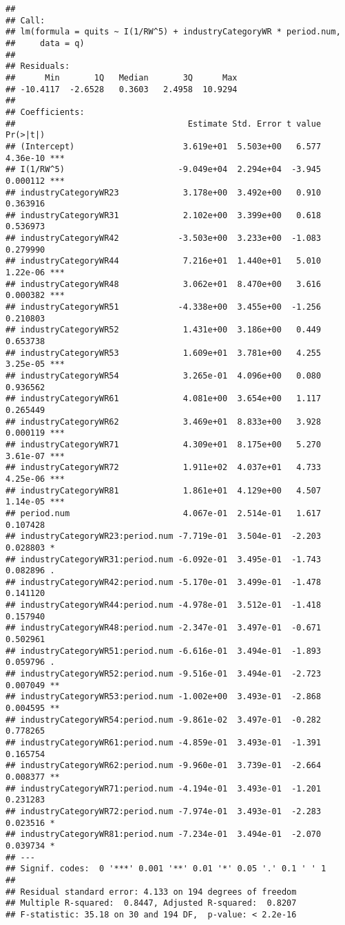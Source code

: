 \documentclass[
]{article}
\begin{document}
\begin{verbatim}
## 
## Call:
## lm(formula = quits ~ I(1/RW^5) + industryCategoryWR * period.num, 
##     data = q)
## 
## Residuals:
##      Min       1Q   Median       3Q      Max 
## -10.4117  -2.6528   0.3603   2.4958  10.9294 
## 
## Coefficients:
##                                   Estimate Std. Error t value Pr(>|t|)    
## (Intercept)                      3.619e+01  5.503e+00   6.577 4.36e-10 ***
## I(1/RW^5)                       -9.049e+04  2.294e+04  -3.945 0.000112 ***
## industryCategoryWR23             3.178e+00  3.492e+00   0.910 0.363916    
## industryCategoryWR31             2.102e+00  3.399e+00   0.618 0.536973    
## industryCategoryWR42            -3.503e+00  3.233e+00  -1.083 0.279990    
## industryCategoryWR44             7.216e+01  1.440e+01   5.010 1.22e-06 ***
## industryCategoryWR48             3.062e+01  8.470e+00   3.616 0.000382 ***
## industryCategoryWR51            -4.338e+00  3.455e+00  -1.256 0.210803    
## industryCategoryWR52             1.431e+00  3.186e+00   0.449 0.653738    
## industryCategoryWR53             1.609e+01  3.781e+00   4.255 3.25e-05 ***
## industryCategoryWR54             3.265e-01  4.096e+00   0.080 0.936562    
## industryCategoryWR61             4.081e+00  3.654e+00   1.117 0.265449    
## industryCategoryWR62             3.469e+01  8.833e+00   3.928 0.000119 ***
## industryCategoryWR71             4.309e+01  8.175e+00   5.270 3.61e-07 ***
## industryCategoryWR72             1.911e+02  4.037e+01   4.733 4.25e-06 ***
## industryCategoryWR81             1.861e+01  4.129e+00   4.507 1.14e-05 ***
## period.num                       4.067e-01  2.514e-01   1.617 0.107428    
## industryCategoryWR23:period.num -7.719e-01  3.504e-01  -2.203 0.028803 *  
## industryCategoryWR31:period.num -6.092e-01  3.495e-01  -1.743 0.082896 .  
## industryCategoryWR42:period.num -5.170e-01  3.499e-01  -1.478 0.141120    
## industryCategoryWR44:period.num -4.978e-01  3.512e-01  -1.418 0.157940    
## industryCategoryWR48:period.num -2.347e-01  3.497e-01  -0.671 0.502961    
## industryCategoryWR51:period.num -6.616e-01  3.494e-01  -1.893 0.059796 .  
## industryCategoryWR52:period.num -9.516e-01  3.494e-01  -2.723 0.007049 ** 
## industryCategoryWR53:period.num -1.002e+00  3.493e-01  -2.868 0.004595 ** 
## industryCategoryWR54:period.num -9.861e-02  3.497e-01  -0.282 0.778265    
## industryCategoryWR61:period.num -4.859e-01  3.493e-01  -1.391 0.165754    
## industryCategoryWR62:period.num -9.960e-01  3.739e-01  -2.664 0.008377 ** 
## industryCategoryWR71:period.num -4.194e-01  3.493e-01  -1.201 0.231283    
## industryCategoryWR72:period.num -7.974e-01  3.493e-01  -2.283 0.023516 *  
## industryCategoryWR81:period.num -7.234e-01  3.494e-01  -2.070 0.039734 *  
## ---
## Signif. codes:  0 '***' 0.001 '**' 0.01 '*' 0.05 '.' 0.1 ' ' 1
## 
## Residual standard error: 4.133 on 194 degrees of freedom
## Multiple R-squared:  0.8447, Adjusted R-squared:  0.8207 
## F-statistic: 35.18 on 30 and 194 DF,  p-value: < 2.2e-16
\end{verbatim}
\end{document}
